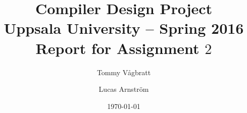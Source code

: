 \documentclass[a4paper,11pt]{article}
\title{\textbf{Compiler Design Project\\
    Uppsala University -- Spring 2016 \\
      Report for Assignment $2$}}
\author{Tommy V\aa gbratt \and Lucas Arnstr\"om}
\date{\today}
\begin{document}
\maketitle

\noindent


\end{document}
